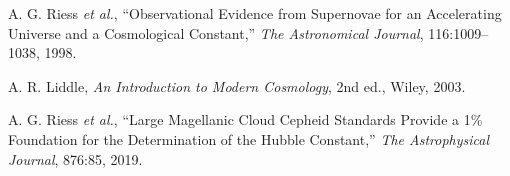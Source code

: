 \documentclass[12pt]{article}
\begin{document}
\begin{thebibliography}{9}
A. G. Riess \textit{et al.},
``Observational Evidence from Supernovae for an Accelerating Universe and a Cosmological Constant,''
\textit{The Astronomical Journal}, 116:1009--1038, 1998.

A. R. Liddle,
\textit{An Introduction to Modern Cosmology},
2nd ed., Wiley, 2003.

A. G. Riess \textit{et al.},
``Large Magellanic Cloud Cepheid Standards Provide a 1\% Foundation for the Determination of the Hubble Constant,''
\textit{The Astrophysical Journal}, 876:85, 2019.

\end{thebibliography}
\end{document}
